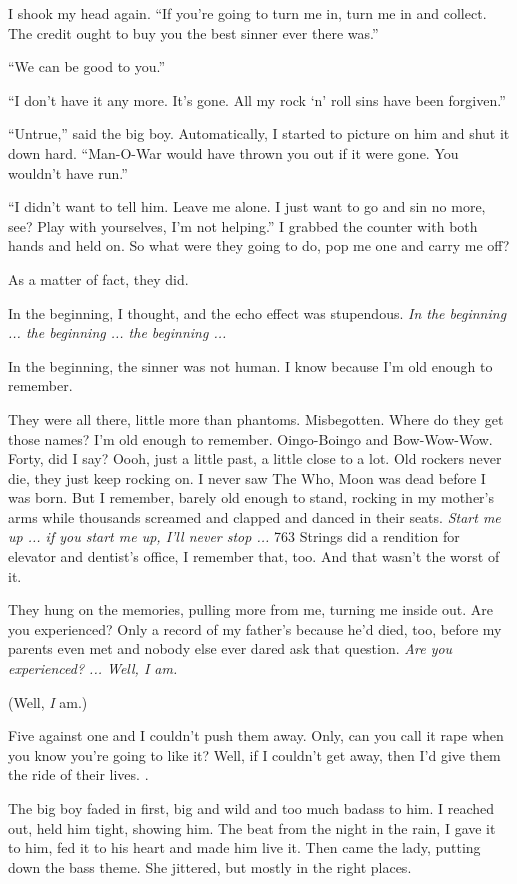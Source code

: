 I shook my head again. ``If you're going to turn me in, turn me in and collect. The credit ought to buy you the best sinner ever there was.''

``We can be good to you.''

``I don't have it any more. It's gone. All my rock `n' roll sins have been forgiven.''

``Untrue,'' said the big boy. Automatically, I started to picture on him and shut it down hard. ``Man-O-War would have thrown you out if it were gone. You wouldn't have run.''

``I didn't want to tell him. Leave me alone. I just want to go and sin no more, see? Play with yourselves, I'm not helping.'' I grabbed the counter with both hands and held on. So what were they going to do, pop me one and carry me off?

As a matter of fact, they did.

In the beginning, I thought, and the echo effect was stupendous. \textit{In the beginning ... the beginning ... the beginning ...}

In the beginning, the sinner was not human. I know because I'm old enough to remember.

They were all there, little more than phantoms. Misbegotten. Where do they get those names? I'm old enough to remember. Oingo-Boingo and Bow-Wow-Wow. Forty, did I say? Oooh, just a little past, a little close to a lot. Old rockers never die, they just keep rocking on. I never saw The Who, Moon was dead before I was born. But I remember, barely old enough to stand, rocking in my mother's arms while thousands screamed and clapped and danced in their seats. \textit{Start me up ... if you start me up, I'll never stop ...} 763 Strings did a rendition for elevator and dentist's office, I remember that, too. And that wasn't the worst of it.

They hung on the memories, pulling more from me, turning me inside out. Are you experienced? Only a record of my father's because he'd died, too, before my parents even met and nobody else ever dared ask that question. \textit{Are you experienced? ... Well, I am.}

(Well, \textit{I} am.)

Five against one and I couldn't push them away. Only, can you call it rape when you know you're going to like it? Well, if I couldn't get away, then I'd give them the ride of their lives.  .

The big boy faded in first, big and wild and too much badass to him. I reached out, held him tight, showing him. The beat from the night in the rain, I gave it to him, fed it to his heart and made him live it. Then came the lady, putting down the bass theme. She jittered, but mostly in the right places.


